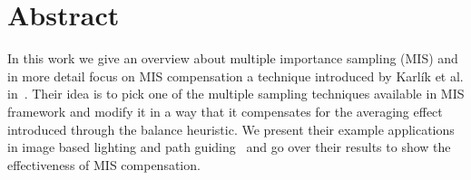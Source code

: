 \chapter{Abstract}
\label{ch:abstract}
In this work we give an overview about multiple importance sampling (MIS)
and in more detail focus on MIS compensation a technique introduced by Karl\'ik et al. in~\cite{Karlik2019}.
Their idea is to pick one of the multiple sampling techniques available in MIS framework
and modify it in a way that it compensates for the averaging effect introduced through the balance heuristic.
We present their example applications in image based lighting
and path guiding~\cite{mueller2017} and go over their results to show the effectiveness of MIS compensation.







